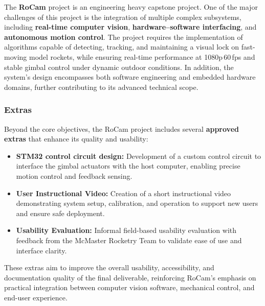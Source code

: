 \documentclass[12pt, titlepage]{article}
\begin{document}
The \textbf{RoCam} project is an engineering heavy capstone project. One of the
major challenges of this project is the integration of multiple complex
subsystems, including \textbf{real-time computer vision},
\textbf{hardware–software interfacing}, and \textbf{autonomous motion control}.
The project requires the implementation of algorithms capable of detecting,
tracking, and maintaining a visual lock on fast-moving model rockets, while
ensuring real-time performance at 1080p\,60\,fps and stable gimbal control
under dynamic outdoor conditions. In addition, the system's design encompasses
both software engineering and embedded hardware domains, further contributing
to its advanced technical scope.

\subsubsection*{Extras}
Beyond the core objectives, the RoCam project includes several
\textbf{approved extras} that enhance its quality and usability:
\begin{itemize}
  \item \textbf{STM32 control circuit design:} Development of a
        custom control circuit to interface the gimbal actuators with
        the host computer, enabling precise motion control and feedback sensing.
  \item \textbf{User Instructional Video:} Creation of a short instructional
        video demonstrating system setup, calibration, and operation to support
        new users and ensure safe deployment.
  \item \textbf{Usability Evaluation:} Informal field-based usability
        evaluation with feedback from the McMaster Rocketry Team to validate
        ease of use and interface clarity.
\end{itemize}

These extras aim to improve the overall usability, accessibility, and
documentation quality of the final deliverable, reinforcing RoCam's emphasis on
practical integration between computer vision software, mechanical control, and
end-user experience.

\end{document}
